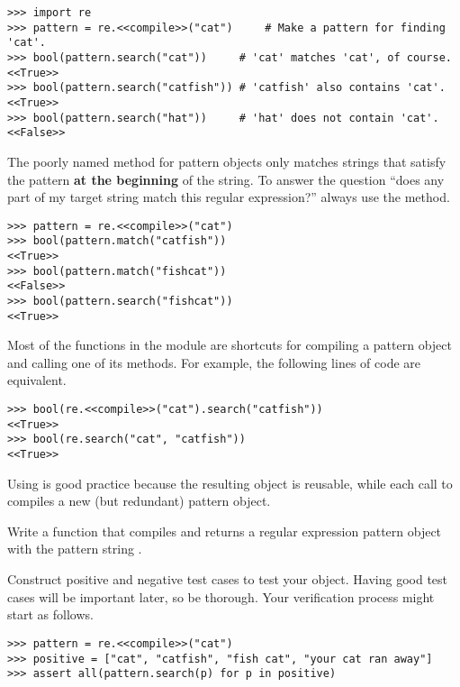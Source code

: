 \begin{lstlisting}
>>> import re
>>> pattern = re.<<compile>>("cat")     # Make a pattern for finding 'cat'.
>>> bool(pattern.search("cat"))     # 'cat' matches 'cat', of course.
<<True>>
>>> bool(pattern.search("catfish")) # 'catfish' also contains 'cat'.
<<True>>
>>> bool(pattern.search("hat"))     # 'hat' does not contain 'cat'.
<<False>>
\end{lstlisting}

\begin{warn} %
The poorly named  method for pattern objects only matches strings that satisfy the pattern \textbf{at the beginning} of the string.
To answer the question ``does any part of my target string match this regular expression?'' always use the  method.
\begin{lstlisting}
>>> pattern = re.<<compile>>("cat")
>>> bool(pattern.match("catfish"))
<<True>>
>>> bool(pattern.match("fishcat"))
<<False>>
>>> bool(pattern.search("fishcat"))
<<True>>
\end{lstlisting}
\end{warn}

\begin{info} %
Most of the functions in the  module are shortcuts for compiling a pattern object and calling one of its methods.
For example, the following lines of code are equivalent.
\begin{lstlisting}
>>> bool(re.<<compile>>("cat").search("catfish"))
<<True>>
>>> bool(re.search("cat", "catfish"))
<<True>>
\end{lstlisting}
Using  is good practice because the resulting object is reusable, while each call to  compiles a new (but redundant) pattern object.
\end{info}

\begin{problem} %
Write a function that compiles and returns a regular expression pattern object with the pattern string .

Construct positive and negative test cases to test your object.
Having good test cases will be important later, so be thorough.
Your verification process might start as follows.
\begin{lstlisting}
>>> pattern = re.<<compile>>("cat")
>>> positive = ["cat", "catfish", "fish cat", "your cat ran away"]
>>> assert all(pattern.search(p) for p in positive)
\end{lstlisting}
\label{prob:regex-superbasic}
\end{problem}


